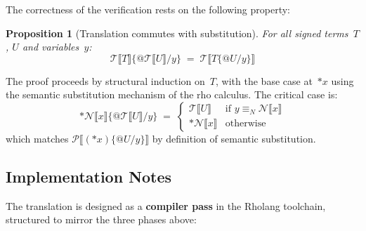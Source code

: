 \documentclass[11pt,a4paper]{article}
\makeatletter
\newtheorem{proposition}[theorem]{Proposition}
\newcommand{\lsem}{\llbracket}
\newcommand{\rsem}{\rrbracket}
\newcommand{\drop}[1]{{\ast} #1}
\newcommand{\quot}[1]{@#1}
\newcommand{\subst}[3]{#1\{#2 / #3\}}
\newcommand{\Neq}{\equiv_{\!N}}
\makeatother
\begin{document}
The correctness of the verification rests on the following
property:

\begin{proposition}[Translation commutes with substitution]
  \label{prop:subst-commute}
  For all signed terms~$T$, $U$ and variables~$y$:
  \[
    \mathcal{T}\lsem T \rsem
    \bigl\{
      \quot{\mathcal{T}\lsem U \rsem} \big/ y
    \bigr\}
    \;=\;
    \mathcal{T}\lsem
      \subst{T}{\quot{U}}{y}
    \rsem
  \]
\end{proposition}

\noindent
The proof proceeds by structural induction on~$T$, with the
base case at~$\drop{x}$ using the semantic substitution
mechanism of the rho calculus.  The critical case is:
\[
  \drop{\mathcal{N}\lsem x \rsem}
  \bigl\{
    \quot{\mathcal{T}\lsem U \rsem} \big/ y
  \bigr\}
  \;=\;
  \begin{cases}
    \mathcal{T}\lsem U \rsem
      & \text{if } y \Neq \mathcal{N}\lsem x \rsem \\
    \drop{\mathcal{N}\lsem x \rsem}
      & \text{otherwise}
  \end{cases}
\]
which matches
$\mathcal{P}\lsem (\drop{x})\{\quot{U}/y\} \rsem$
by definition of semantic substitution.

\subsection{Implementation Notes}
\label{app:impl}

The translation is designed as a \textbf{compiler pass} in the
Rholang toolchain, structured to mirror the three phases
above:
\end{document}
